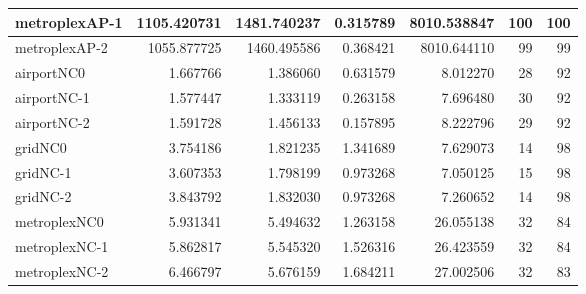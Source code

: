 \begin{longtable}{|l|r|r|r|r|r|r|}
metroplexAP-1 & 1105.420731 & 1481.740237 & 0.315789 & 8010.538847 & 100 & 100 \\ \hline
metroplexAP-2 & 1055.877725 & 1460.495586 & 0.368421 & 8010.644110 & 99 & 99 \\ \hline
airportNC0 & 1.667766 & 1.386060 & 0.631579 & 8.012270 & 28 & 92 \\ \hline
airportNC-1 & 1.577447 & 1.333119 & 0.263158 & 7.696480 & 30 & 92 \\ \hline
airportNC-2 & 1.591728 & 1.456133 & 0.157895 & 8.222796 & 29 & 92 \\ \hline
gridNC0 & 3.754186 & 1.821235 & 1.341689 & 7.629073 & 14 & 98 \\ \hline
gridNC-1 & 3.607353 & 1.798199 & 0.973268 & 7.050125 & 15 & 98 \\ \hline
gridNC-2 & 3.843792 & 1.832030 & 0.973268 & 7.260652 & 14 & 98 \\ \hline
metroplexNC0 & 5.931341 & 5.494632 & 1.263158 & 26.055138 & 32 & 84 \\ \hline
metroplexNC-1 & 5.862817 & 5.545320 & 1.526316 & 26.423559 & 32 & 84 \\ \hline
metroplexNC-2 & 6.466797 & 5.676159 & 1.684211 & 27.002506 & 32 & 83 \\ \hline
\end{longtable}
